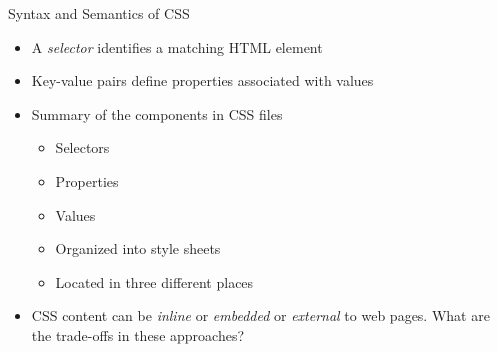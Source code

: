 \documentclass[14pt,aspectratio=169]{beamer}
\begin{document}
%
\begin{frame}{Syntax and Semantics of CSS}
%
  \begin{itemize}
    \item A {\em selector} identifies a matching HTML element
      \vspace*{-.2in}
    \item Key-value pairs define properties associated with values
      \vspace*{-.15in}
    \item Summary of the components in CSS files
      \begin{itemize}
        \item Selectors
        \item Properties
        \item Values
        \item Organized into style sheets
        \item Located in three different places
      \end{itemize}
      \vspace*{-.2in}
    \item CSS content can be {\em inline} or {\em embedded} or {\em external} to web pages.
      What are the trade-offs in these approaches?
  \end{itemize}
%
\end{frame}
\end{document}
